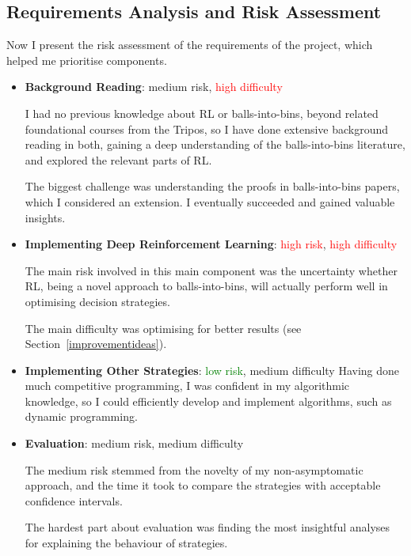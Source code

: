 \subsection{Requirements Analysis and Risk Assessment}

Now I present the risk assessment of the requirements of the project, which helped me prioritise components.

\begin{itemize}

    \item \textbf{Background Reading}: \textcolor{YellowOrange}{medium risk}, \textcolor{Red}{high difficulty}
    
    I had no previous knowledge about RL or balls-into-bins, beyond related foundational courses from the Tripos, so I have done extensive background reading in both, gaining a deep understanding of the balls-into-bins literature, and explored the relevant parts of RL.
    
    The biggest challenge was understanding the proofs in balls-into-bins papers, which I considered an extension. I eventually succeeded and gained valuable insights.
    
    \item \textbf{Implementing Deep Reinforcement Learning}: \textcolor{red}{high risk}, \textcolor{red}{high difficulty}
    
    The main risk involved in this main component was the uncertainty whether RL, being a novel approach to balls-into-bins, will actually perform well in optimising decision strategies.
    
    The main difficulty was optimising \DQL for better results (see Section~\ref{improvementideas}).
    
    \item \textbf{Implementing Other Strategies}: \textcolor{green}{low risk}, \textcolor{YellowOrange}{medium difficulty}
    Having done much competitive programming, I was confident in my algorithmic knowledge, so I could efficiently develop and implement algorithms, such as dynamic programming.
    
    \item \textbf{Evaluation}: \textcolor{YellowOrange}{medium risk}, \textcolor{YellowOrange}{medium difficulty}
    
    The medium risk stemmed from the novelty of my non-asymptomatic approach, and the time it took to compare the strategies with acceptable confidence intervals.
    
    The hardest part about evaluation was finding the most insightful analyses for explaining the behaviour of strategies.
    
\end{itemize}